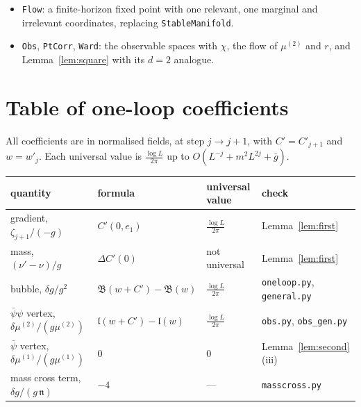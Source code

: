 \documentclass[11pt]{amsart}
\theoremstyle{definition}
\theoremstyle{remark}
\numberwithin{equation}{section}
\begin{document}
\begin{itemize}
\begin{itemize}
    \texttt{hC.psd} in \texttt{H02RG/Step/Est*}, \texttt{H02RG/Obs/StepObs*} and \texttt{Coupling} go
    through the two \texttt{Grassmann} lemmas above;
  \item the local factor of step (A);
  \item Proposition~\ref{prop:ZVK};
  \item the first-order coefficient lemma (Lemma~\ref{lem:first}), which is already in the proof of
    \texttt{thm:flow};
  \item the second-order coefficient lemma (Lemma~\ref{lem:second}).
  \end{itemize}
\item \texttt{Flow}: a finite-horizon fixed point with one relevant, one marginal and irrelevant
  coordinates, replacing \texttt{StableManifold}.
\item \texttt{Obs}, \texttt{PtCorr}, \texttt{Ward}: the observable spaces with $\chi$, the
  flow of $\mu^{(2)}$ and $r$, and Lemma~\ref{lem:square} with its $d=2$ analogue.
\end{itemize}

\appendix
\section{Table of one-loop coefficients}
\label{app:table}
All coefficients are in normalised fields, at step $j\to j+1$, with $C'=C'_{j+1}$ and
$w=w'_j$. Each universal value is $\frac{\log L}{2\pi}$ up to $O(L^{-j}+m^2L^{2j}+\bar g)$.

\medskip
\begin{center}
\renewcommand{\arraystretch}{1.3}
\begin{tabular}{l|l|l|l}
quantity & formula & universal value & check\\\hline
gradient, $\zeta_{j+1}/(-g)$ & $C'(0,e_1)$ & $\frac{\log L}{2\pi}$ & Lemma~\ref{lem:first}\\
mass, $(\nu'-\nu)/g$ & $\Delta C'(0)$ & not universal & Lemma~\ref{lem:first}\\
bubble, $\delta g/g^2$ & $\mathfrak B(w+C')-\mathfrak B(w)$ & $\frac{\log L}{2\pi}$ & \texttt{oneloop.py}, \texttt{general.py}\\
$\bar\psi\psi$ vertex, $\delta\mu^{(2)}/(g\mu^{(2)})$ & $\mathfrak l(w+C')-\mathfrak l(w)$ & $\frac{\log L}{2\pi}$ & \texttt{obs.py}, \texttt{obs\_gen.py}\\
$\bar\psi$ vertex, $\delta\mu^{(1)}/(g\mu^{(1)})$ & $0$ & $0$ & Lemma~\ref{lem:second}(iii)\\
mass cross term, $\delta g/(g\,\mathfrak n)$ & $-4$ & --- & \texttt{masscross.py}
\end{tabular}
\end{center}
\medskip
\end{document}
